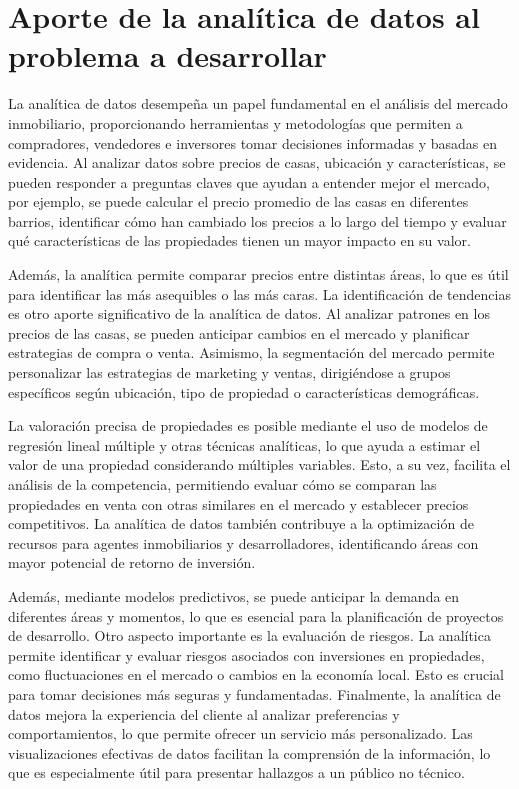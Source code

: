 \documentclass[12pt,a4paper]{article}
\begin{document}
\section{Aporte de la analítica de datos al problema a desarrollar}
La analítica de datos desempeña un papel fundamental en el análisis del mercado inmobiliario, proporcionando herramientas y metodologías que permiten a compradores, vendedores e inversores tomar decisiones informadas y basadas en evidencia. Al analizar datos sobre precios de casas, ubicación y características, se pueden responder a preguntas claves que ayudan a entender mejor el mercado, por ejemplo, se puede calcular el precio promedio de las casas en diferentes barrios, identificar cómo han cambiado los precios a lo largo del tiempo y evaluar qué características de las propiedades tienen un mayor impacto en su valor.

Además, la analítica permite comparar precios entre distintas áreas, lo que es útil para identificar las más asequibles o las más caras. La identificación de tendencias es otro aporte significativo de la analítica de datos. Al analizar patrones en los precios de las casas, se pueden anticipar cambios en el mercado y planificar estrategias de compra o venta. Asimismo, la segmentación del mercado permite personalizar las estrategias de marketing y ventas, dirigiéndose a grupos específicos según ubicación, tipo de propiedad o características demográficas.

La valoración precisa de propiedades es posible mediante el uso de modelos de regresión lineal múltiple y otras técnicas analíticas, lo que ayuda a estimar el valor de una propiedad considerando múltiples variables. Esto, a su vez, facilita el análisis de la competencia, permitiendo evaluar cómo se comparan las propiedades en venta con otras similares en el mercado y establecer precios competitivos. La analítica de datos también contribuye a la optimización de recursos para agentes inmobiliarios y desarrolladores, identificando áreas con mayor potencial de retorno de inversión.

Además, mediante modelos predictivos, se puede anticipar la demanda en diferentes áreas y momentos, lo que es esencial para la planificación de proyectos de desarrollo. Otro aspecto importante es la evaluación de riesgos. La analítica permite identificar y evaluar riesgos asociados con inversiones en propiedades, como fluctuaciones en el mercado o cambios en la economía local. Esto es crucial para tomar decisiones más seguras y fundamentadas. 
Finalmente, la analítica de datos mejora la experiencia del cliente al analizar preferencias y comportamientos, lo que permite ofrecer un servicio más personalizado. Las visualizaciones efectivas de datos facilitan la comprensión de la información, lo que es especialmente útil para presentar hallazgos a un público no técnico.
\end{document}
